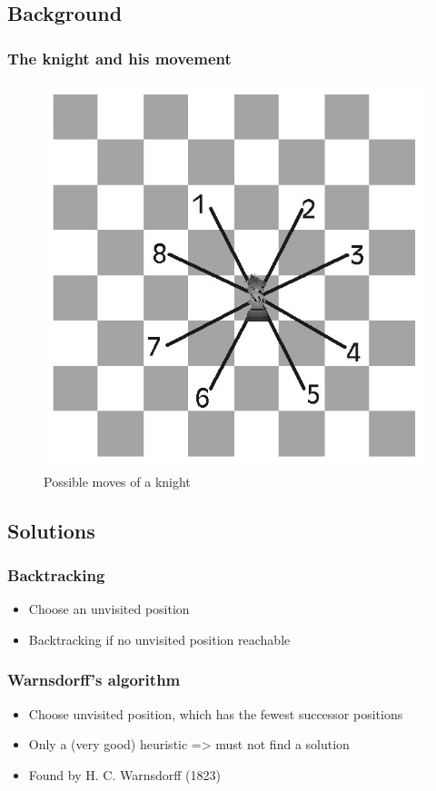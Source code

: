 \documentclass{beamer}
\begin{document}
\subsection{Background}
\begin{frame}
\frametitle{The knight and his movement}
\begin{figure}
\includegraphics[scale=0.25]{sprung}
\caption{Possible moves of a knight}
\end{figure}
\end{frame}

\subsection{Solutions}
\begin{frame}
\frametitle{Backtracking}
\begin{itemize}
	\item Choose an unvisited position
	\item Backtracking if no unvisited position reachable
\end{itemize}
\end{frame}

\begin{frame}
\frametitle{Warnsdorff's algorithm}
\begin{itemize}
	\item Choose unvisited position, which has the fewest successor positions
	\item Only a (very good) heuristic => must not find a solution
	\item Found by H. C. Warnsdorff (1823)
\end{itemize}
\end{frame}
\end{document}
